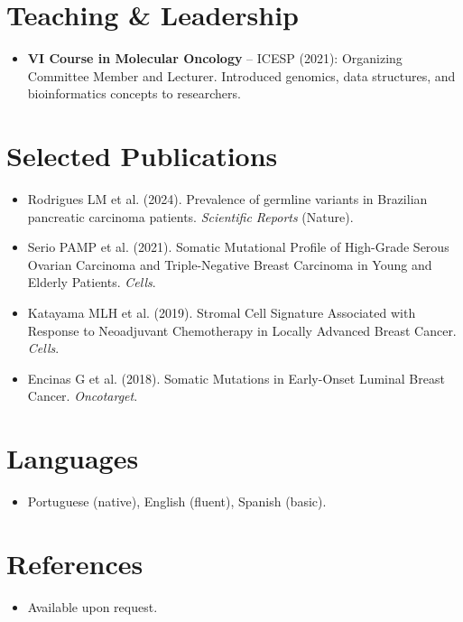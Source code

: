 \documentclass[11pt,a4paper,sans]{moderncv}
\begin{document}

\section{Teaching \& Leadership}
\vspace{1pt}
\begin{itemize}
\item{\textbf{VI Course in Molecular Oncology} -- ICESP (2021): Organizing Committee Member and Lecturer. Introduced genomics, data structures, and bioinformatics concepts to researchers.
}
\end{itemize}


\section{Selected Publications}
\vspace{1pt}
\begin{itemize}
\item Rodrigues LM et al. (2024). Prevalence of germline variants in Brazilian pancreatic carcinoma patients. \textit{Scientific Reports} (Nature).
\item Serio PAMP et al. (2021). Somatic Mutational Profile of High-Grade Serous Ovarian Carcinoma and Triple-Negative Breast Carcinoma in Young and Elderly Patients. \textit{Cells}.
\item Katayama MLH et al. (2019). Stromal Cell Signature Associated with Response to Neoadjuvant Chemotherapy in Locally Advanced Breast Cancer. \textit{Cells}.
\item Encinas G et al. (2018). Somatic Mutations in Early-Onset Luminal Breast Cancer. \textit{Oncotarget}.
\end{itemize}


\section{Languages}
\vspace{1pt}
\begin{itemize}
\item Portuguese (native), English (fluent), Spanish (basic).
\end{itemize}


\section{References}
\vspace{1pt}
\begin{itemize}
\item{Available upon request.}
\end{itemize}
\end{document}
